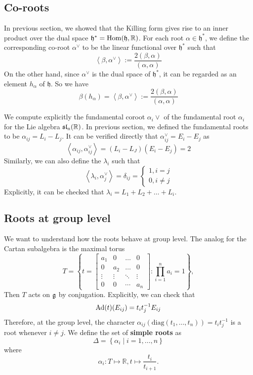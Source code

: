 \subsection{Co-roots}
In previous section, we showed that the Killing form gives rise to an inner product over 
the dual space $\mathfrak{h}^* = \operatorname{Hom}(\mathfrak{h}, \mathbb{R})$. For each root $\alpha \in \mathfrak{h}^*$, we define the 
corresponding co-root $\alpha^\vee$ to be the linear functional over $\mathfrak{h}^*$ such that
\[\left\langle \beta, \alpha^\vee\right\rangle:= \dfrac{2(\beta,\alpha)}{(\alpha,\alpha)}\]
On the other hand, since $\alpha^\vee$ is the dual space of $\mathfrak{h}^*$, it can be regarded 
as an element $h_\alpha$ of $\mathfrak{h}$. So we have 
\[\beta(h_\alpha)=\left\langle \beta, \alpha^\vee\right\rangle:= \dfrac{2(\beta,\alpha)}{(\alpha,\alpha)} \]
\begin{example}
    We compute explicitly the fundamental coroot $\alpha_i\vee$ of the fundamental root $\alpha_i$ for the Lie algebra 
    $\operatorname{\mathfrak{sl}_n(\mathbb{R})}$. In previous section, we defined the fundamental roots to be $\alpha_{ij} = L_i-L_j$. It can be 
    verified directly that $\alpha_{ij}^\vee = E_i-E_{j}$ as 
    \[\left\langle \alpha_{ij}, \alpha_{ij}^\vee \right\rangle = (L_i-L_J)(E_i-E_j)=2\]
    Similarly, we can also define the $\lambda_i$ such that 
    \[\left\langle \lambda_i,\alpha_j^\vee\right\rangle = \delta_{ij} = \begin{cases}
        1, i =j\\
        0, i \ne j
    \end{cases}\]
    Explicitly, it can be checked that $\lambda_i = L_1+L_2+\ldots+L_i$.
\end{example}
\subsection{Roots at group level}
We want to understand how the roots behave at group level. The analog for the Cartan subalgebra is the maximal torus
\[T = \left\lbrace t= \begin{bmatrix}
        a_1    & 0      & \ldots & 0      \\
        0      & a_2    & \ldots & 0      \\
        \vdots & \vdots & \ddots & \vdots \\
        0      & 0      & \cdots & a_n
    \end{bmatrix} :  \prod_{i=1}^na_i =1\right\rbrace,\]
Then $T$ acts on $\operatorname{\mathfrak{g}}$ by conjugation. Explicitly, we can check that
\[\operatorname{\text{Ad}}(t)(E_{ij}) = t_it_j^{-1}E_{ij}\]
Therefore, at the group level, the character $\alpha_{ij}(\text{diag}(t_1,\ldots,t_n))=t_it_j^{-1}$
is a root whenever $i \ne j$. We define the set of  \textbf{simple roots} as
\[\Delta = \left\lbrace \alpha_i\mid i =1,\ldots,n \right\rbrace\]
where
\[\alpha_i \colon T \mapsto \mathbb{R}, t \mapsto \dfrac{t_i}{t_{i+1}}.\]

